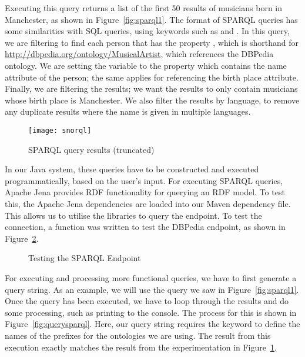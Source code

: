 Executing this query returns a list of the first 50 results of musicians born in Manchester, as shown in Figure~\ref{fig:sparql1}. The format of SPARQL queries has some similarities with SQL queries, using keywords such as  and . In this query, we are filtering to find each person that has the property , which is shorthand for \url{http://dbpedia.org/ontology/MusicalArtist}, which references the DBPedia ontology. We are setting the variable  to the property  which contains the name attribute of the person; the same applies for  referencing the birth place attribute. Finally, we are filtering the results; we want the results to only contain musicians whose birth place is Manchester. We also filter the  results by language, to remove any duplicate results where the name is given in multiple languages.

\begin{figure}[h]
	\centering
	\texttt{[image: snorql]}
	\caption{SPARQL query results (truncated)}
	\label{fig:sparql2}
\end{figure}

In our Java system, these queries have to be constructed and executed programmatically, based on the user's input. For executing SPARQL queries, Apache Jena \cite{apachejena} provides RDF functionality for querying an RDF model. To test this, the Apache Jena dependencies are loaded into our Maven dependency file. This allows us to utilise the  libraries to query the endpoint. To test the connection, a function was written to test the DBPedia endpoint, as shown in Figure~\ref{fig:testrdf}.

\begin{figure}[h]
	\centering
	\qquad
	\caption{Testing the SPARQL Endpoint}
	\label{fig:testrdf}
\end{figure}

For executing and processing more functional queries, we have to first generate a query string. As an example, we will use the query we saw in Figure~\ref{fig:sparql1}. Once the query has been executed, we have to loop through the results and do some processing, such as printing to the console. The process for this is shown in Figure~\ref{fig:querysparql}. Here, our query string requires the  keyword to define the names of the prefixes for the ontologies we are using. The result from this execution exactly matches the result from the experimentation in Figure~\ref{fig:sparql2}.

